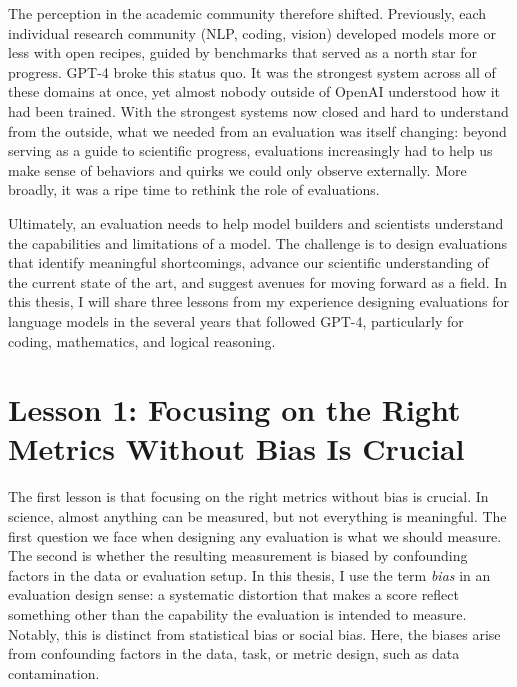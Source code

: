 The perception in the academic community therefore shifted. Previously, each individual research 
community (NLP, coding, vision) developed models more or less with open recipes, guided by benchmarks 
that served as a north star for progress. GPT-4 broke this status quo. It was the strongest system across 
all of these domains at once, yet almost nobody outside of OpenAI understood how it had been trained. 
With the strongest systems now closed and hard to understand from the outside, what we needed from an
evaluation was itself changing: beyond serving as a guide to scientific progress, evaluations increasingly
had to help us make sense of behaviors and quirks we could only observe externally. More broadly, it was a
ripe time to rethink the role of evaluations.

Ultimately, an evaluation needs to help model builders and scientists understand the
capabilities and limitations of a model. The challenge is to design evaluations that
identify meaningful shortcomings, advance our scientific understanding of the current
state of the art, and suggest avenues for moving forward as a field. In this
thesis, I will share three lessons from my experience designing evaluations for language models
in the several years that followed GPT-4, particularly for coding, mathematics, and logical reasoning.


\section{Lesson 1: Focusing on the Right Metrics Without Bias Is Crucial}
\label{sec:intro-right-metrics-without-bias}

The first lesson is that focusing on the right metrics without bias is crucial. In science,
almost anything can be measured, but not everything is meaningful. The first question we face when designing any
evaluation is what we should measure. The second is whether the resulting measurement is biased by
confounding factors in the data or evaluation setup. In this thesis, I use the term \textit{bias} in an evaluation design sense:
a systematic distortion that makes a score reflect something other than the capability the evaluation is intended to measure.
Notably, this is distinct from statistical bias or social bias. Here, the biases arise from confounding factors in the data, task, or metric design,
such as data contamination.

